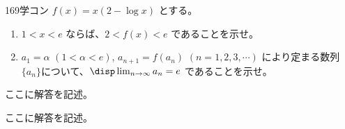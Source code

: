 \begin{prob}{169}{}{学コン}
 $f(x)=x(2-\log x)$ とする。
 \begin{enumerate}
  \item $1<x<e$ ならば、$2<f(x)<e$ であることを示せ。
  \item $a_1=\alpha$ $(1<\alpha <e)$, $a_{n+1}=f(a_n)$ $(n=1, 2, 3, \cdots)$ により定まる数列$\{a_n\}$について、$\disp \lim_{n\to\infty} a_n = e$ であることを示せ。
 \end{enumerate}
\end{prob}
ここに解答を記述。

ここに解答を記述。